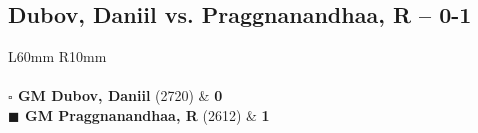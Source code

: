 \documentclass[../main.tex]{subfiles}
\begin{document}
\subsection{Dubov,  Daniil vs. Praggnanandhaa,  R -- 0-1}

\begin{multicols*}{2}

\begin{tabular}{L{60mm} R{10mm}}
\\ 
\\[3mm]
\textbf{$\square$ \hspace{2mm}  GM Dubov,  Daniil} (2720)  & \textbf{0}\\ 
\textbf{$\blacksquare$ \hspace{2mm}  GM Praggnanandhaa,  R} (2612)  & \textbf{1}\\ 
\end{tabular}

\end{multicols*}
\pagebreak
\end{document}

